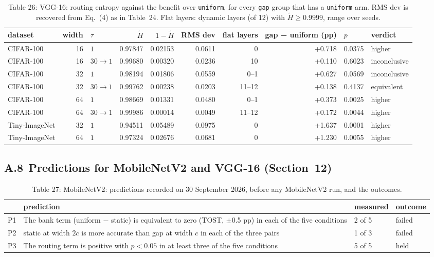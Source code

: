 \documentclass{article}
\begin{document}
\begin{table}
\caption{Table 26: VGG-16: routing entropy against the benefit over
\texttt{uniform}, for every \texttt{gap} group that has a \texttt{uniform}
arm. RMS dev is recovered from Eq.~(4) as in
Table~24. Flat layers: dynamic layers (of 12)
with $\tilde H\ge0.9999$, range over seeds.}

\begin{tabular}{l r l rrr r rll}
\toprule
dataset & width & $\tau$ & $\tilde H$ & $1-\tilde H$ & RMS dev & flat layers & gap − uniform (pp) & $p$ & verdict \\
\midrule
CIFAR‑100 & 16 & $1$ & 0.97847 & 0.02153 & 0.0611 & 0 & +0.718 & 0.0375 & higher \\
CIFAR‑100 & 16 & $30\!\to\!1$ & 0.99680 & 0.00320 & 0.0236 & 10 & +0.110 & 0.6023 & inconclusive \\
CIFAR‑100 & 32 & $1$ & 0.98194 & 0.01806 & 0.0559 & 0--1 & +0.627 & 0.0569 & inconclusive \\
CIFAR‑100 & 32 & $30\!\to\!1$ & 0.99762 & 0.00238 & 0.0203 & 11--12 & +0.138 & 0.4137 & equivalent \\
CIFAR‑100 & 64 & $1$ & 0.98669 & 0.01331 & 0.0480 & 0--1 & +0.373 & 0.0025 & higher \\
CIFAR‑100 & 64 & $30\!\to\!1$ & 0.99986 & 0.00014 & 0.0049 & 11--12 & +0.172 & 0.0044 & higher \\
Tiny‑ImageNet & 32 & $1$ & 0.94511 & 0.05489 & 0.0975 & 0 & +1.637 & 0.0001 & higher \\
Tiny‑ImageNet & 64 & $1$ & 0.97324 & 0.02676 & 0.0681 & 0 & +1.230 & 0.0055 & higher \\
\bottomrule
\end{tabular}
\end{table}



\subsection*{A.8 Predictions for MobileNetV2 and VGG-16 (Section~12)}

\begin{table}
\caption{Table 27: MobileNetV2: predictions recorded on 30 September 2026, before
any MobileNetV2 run, and the outcomes.}

\begin{tabular}{l p{8.2cm} l l}
\toprule
& prediction & measured & outcome \\
\midrule
P1 & The bank term (uniform − static) is equivalent to zero (TOST, $\pm$0.5 pp) in each of the five conditions & 2 of 5 & failed \\
P2 & static at width $2c$ is more accurate than gap at width $c$ in each of the three pairs & 1 of 3 & failed \\
P3 & The routing term is positive with $p<0.05$ in at least three of the five conditions & 5 of 5 & held \\
\bottomrule
\end{tabular}
\end{table}
\end{document}
